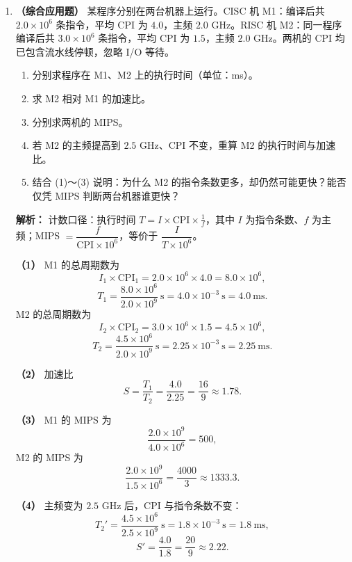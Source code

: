 \begin{enumerate}[leftmargin=*]
    \vspace{8pt}

    \item \textbf{（综合应用题）}
    某程序分别在两台机器上运行。CISC 机 M1：编译后共 $2.0\times10^{6}$ 条指令，平均 CPI 为 $4.0$，主频 $2.0$ GHz。RISC 机 M2：同一程序编译后共 $3.0\times10^{6}$ 条指令，平均 CPI 为 $1.5$，主频 $2.0$ GHz。两机的 CPI 均已包含流水线停顿，忽略 I/O 等待。
    \begin{enumerate}
        \item[(1)] 分别求程序在 M1、M2 上的执行时间（单位：ms）。
        \item[(2)] 求 M2 相对 M1 的加速比。
        \item[(3)] 分别求两机的 MIPS。
        \item[(4)] 若 M2 的主频提高到 $2.5$ GHz、CPI 不变，重算 M2 的执行时间与加速比。
        \item[(5)] 结合 (1)～(3) 说明：为什么 M2 的指令条数更多，却仍然可能更快？能否仅凭 MIPS 判断两台机器谁更快？
    \end{enumerate}

    \ifshowsolutions\par\noindent\textbf{解析：}
    计数口径：执行时间 $T=I\times\mathrm{CPI}\times\frac{1}{f}$，其中 $I$ 为指令条数、$f$ 为主频；MIPS $=\dfrac{f}{\mathrm{CPI}\times10^{6}}$，等价于 $\dfrac{I}{T\times10^{6}}$。

    \textbf{（1）} M1 的总周期数为
    \[
    I_1\times\mathrm{CPI}_1=2.0\times10^{6}\times4.0=8.0\times10^{6},
    \]
    \[
    T_1=\frac{8.0\times10^{6}}{2.0\times10^{9}}\ \mathrm{s}=4.0\times10^{-3}\ \mathrm{s}=4.0\ \mathrm{ms}.
    \]
    M2 的总周期数为
    \[
    I_2\times\mathrm{CPI}_2=3.0\times10^{6}\times1.5=4.5\times10^{6},
    \]
    \[
    T_2=\frac{4.5\times10^{6}}{2.0\times10^{9}}\ \mathrm{s}=2.25\times10^{-3}\ \mathrm{s}=2.25\ \mathrm{ms}.
    \]

    \textbf{（2）} 加速比
    \[
    S=\frac{T_1}{T_2}=\frac{4.0}{2.25}=\frac{16}{9}\approx1.78.
    \]

    \textbf{（3）} M1 的 MIPS 为
    \[
    \frac{2.0\times10^{9}}{4.0\times10^{6}}=500,
    \]
    M2 的 MIPS 为
    \[
    \frac{2.0\times10^{9}}{1.5\times10^{6}}=\frac{4000}{3}\approx1333.3.
    \]

    \textbf{（4）} 主频变为 $2.5$ GHz 后，CPI 与指令条数不变：
    \[
    T_2'=\frac{4.5\times10^{6}}{2.5\times10^{9}}\ \mathrm{s}=1.8\times10^{-3}\ \mathrm{s}=1.8\ \mathrm{ms},
    \]
    \[
    S'=\frac{4.0}{1.8}=\frac{20}{9}\approx2.22.
    \]


\end{enumerate}

